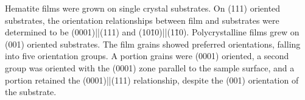 Hematite  films were grown on single crystal  substrates. On (111) oriented substrates, the orientation relationships between film and substrates were determined to be  (0001)||(111) and (10\={1}0)||(1\={1}0). Polycrystalline films grew on (001) oriented substrates. The film grains showed preferred orientations, falling into five orientation groups. A portion grains were (0001) oriented, a second group was oriented with the (0001) zone parallel to the sample surface, and a portion retained the (0001)||(111) relationship, despite the (001) orientation of the substrate.